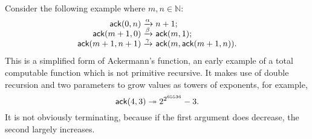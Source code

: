 Consider the following example where \(m,n \in \mathbb{N}\):
\begin{equation*}
\begin{array}{@{}r@{\;}l@{\;}l@{}}
\fun{ack}(0,n)     & \xrightarrow{\smash{\alpha}} & n+1;\\
\fun{ack}(m+1,0)   & \xrightarrow{\smash{\beta}}  & \fun{ack}(m,1);\\
\fun{ack}(m+1,n+1) & \xrightarrow{\smash{\gamma}}
                   & \fun{ack}(m,\fun{ack}(m+1,n)).
\end{array}
\end{equation*}
This is a simplified form of Ackermann's
function, an early example of a total
computable function which is not primitive recursive. It makes use of
double recursion and two parameters to grow values as towers of
exponents, for example,
\begin{equation*}
  \textsf{ack}(4,3) \twoheadrightarrow 2^{2^{65536}} - 3.
\end{equation*}
It is not obviously terminating, because if the first argument does
decrease, the second largely increases.

